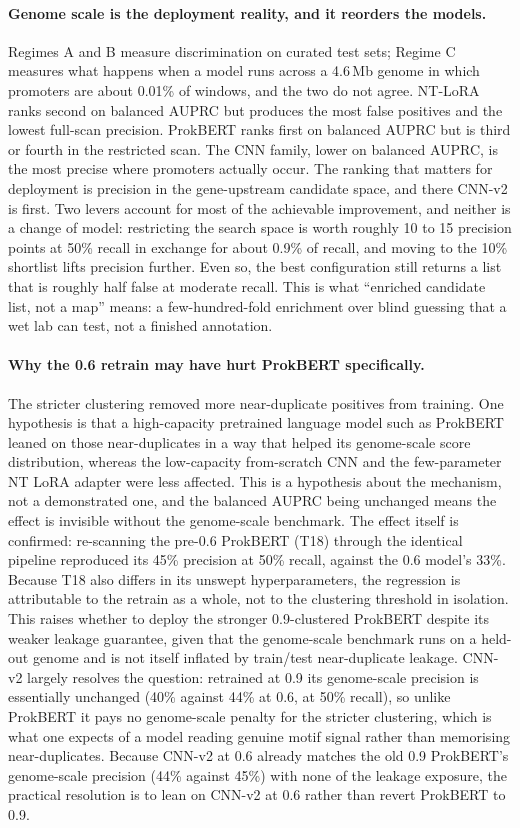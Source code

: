 \documentclass{article}
\begin{document}
\paragraph{Genome scale is the deployment reality, and it reorders the models.} Regimes A and B measure discrimination on curated test sets; Regime C measures what happens when a model runs across a 4.6\,Mb genome in which promoters are about 0.01\% of windows, and the two do not agree. NT-LoRA ranks second on balanced AUPRC but produces the most false positives and the lowest full-scan precision. ProkBERT ranks first on balanced AUPRC but is third or fourth in the restricted scan. The CNN family, lower on balanced AUPRC, is the most precise where promoters actually occur. The ranking that matters for deployment is precision in the gene-upstream candidate space, and there CNN-v2 is first. Two levers account for most of the achievable improvement, and neither is a change of model: restricting the search space is worth roughly 10 to 15 precision points at 50\% recall in exchange for about 0.9\% of recall, and moving to the 10\% shortlist lifts precision further. Even so, the best configuration still returns a list that is roughly half false at moderate recall. This is what ``enriched candidate list, not a map'' means: a few-hundred-fold enrichment over blind guessing that a wet lab can test, not a finished annotation.

\paragraph{Why the 0.6 retrain may have hurt ProkBERT specifically.} The stricter clustering removed more near-duplicate positives from training. One hypothesis is that a high-capacity pretrained language model such as ProkBERT leaned on those near-duplicates in a way that helped its genome-scale score distribution, whereas the low-capacity from-scratch CNN and the few-parameter NT LoRA adapter were less affected. This is a hypothesis about the mechanism, not a demonstrated one, and the balanced AUPRC being unchanged means the effect is invisible without the genome-scale benchmark. The effect itself is confirmed: re-scanning the pre-0.6 ProkBERT (T18) through the identical pipeline reproduced its 45\% precision at 50\% recall, against the 0.6 model's 33\%. Because T18 also differs in its unswept hyperparameters, the regression is attributable to the retrain as a whole, not to the clustering threshold in isolation. This raises whether to deploy the stronger 0.9-clustered ProkBERT despite its weaker leakage guarantee, given that the genome-scale benchmark runs on a held-out genome and is not itself inflated by train/test near-duplicate leakage. CNN-v2 largely resolves the question: retrained at 0.9 its genome-scale precision is essentially unchanged (40\% against 44\% at 0.6, at 50\% recall), so unlike ProkBERT it pays no genome-scale penalty for the stricter clustering, which is what one expects of a model reading genuine motif signal rather than memorising near-duplicates. Because CNN-v2 at 0.6 already matches the old 0.9 ProkBERT's genome-scale precision (44\% against 45\%) with none of the leakage exposure, the practical resolution is to lean on CNN-v2 at 0.6 rather than revert ProkBERT to 0.9.
\end{document}
